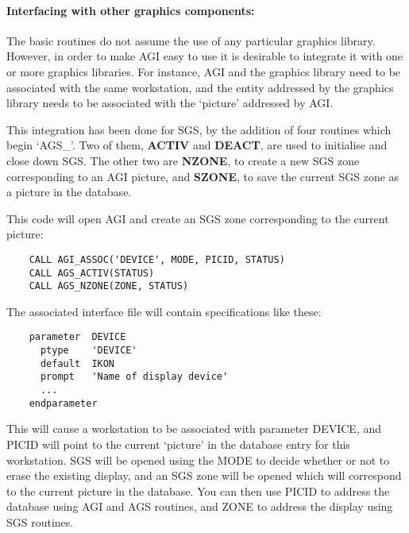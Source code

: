 \paragraph{Interfacing with other graphics components:}\hfill
{}

The basic routines do not assume the use of any particular graphics
library.
However, in order to make AGI easy to use it is desirable to integrate it
with one or more graphics libraries.
For instance, AGI and the graphics library need to be associated with the
same workstation, and the entity addressed by the graphics library needs
to be associated with the `picture' addressed by AGI.

This integration has been done for SGS, by the addition of four routines which
begin `AGS\_'.
Two of them, {\bf ACTIV} and {\bf DEACT}, are used to initialise and close down
SGS.
The other two are {\bf NZONE}, to create a new SGS zone corresponding to an AGI
picture, and {\bf SZONE}, to save the current SGS zone as a picture in the
database.

This code will open AGI and create an SGS zone corresponding to the current
picture:

\begin{small}
\begin{verbatim}
    CALL AGI_ASSOC('DEVICE', MODE, PICID, STATUS)
    CALL AGS_ACTIV(STATUS)
    CALL AGS_NZONE(ZONE, STATUS)
\end{verbatim}
\end{small}

The associated interface file will contain specifications like these:

\begin{small}
\begin{verbatim}
    parameter  DEVICE
      ptype    'DEVICE'
      default  IKON
      prompt   'Name of display device'
      ...
    endparameter
\end{verbatim}
\end{small}

This will cause a workstation to be associated with parameter DEVICE, and PICID
will point to the current `picture' in the database entry for this workstation.
SGS will be opened using the MODE to decide whether or not to erase the
existing display, and an SGS zone will be opened which will correspond to the
current picture in the database.
You can then use PICID to address the database using AGI and AGS routines,
and ZONE to address the display using SGS routines.

